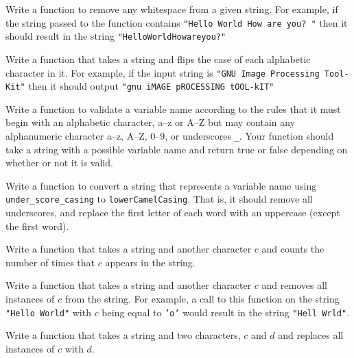 \begin{exer}
Write a function to remove any whitespace from a given string.  
For example, if the string passed to the function contains
\texttt{"Hello World How    are you?  "} then it should
result in the string \texttt{"HelloWorldHowareyou?"}
\end{exer}

\begin{exer}
Write a function that takes a string and flips the case of each
alphabetic character in it.  For example, if the input string is 
\texttt{"GNU Image Processing Tool-Kit"} then it should
output \texttt{"gnu iMAGE pROCESSING tOOL-kIT"}
\end{exer}

\begin{exer}
Write a function to validate a variable name according to the rules
that it must begin with an alphabetic character, a--z or A--Z but
may contain any alphanumeric character a--z, A--Z, 0--9, or underscores
\texttt{_}.  Your function should take a string with a possible
variable name and return true or false depending on whether or
not it is valid.
\end{exer}

\begin{exer}
Write a function to convert a string that represents a variable name
using \texttt{under_score_casing} to \texttt{lowerCamelCasing}.
That is, it should remove all underscores, and replace the first
letter of each word with an uppercase (except the first word).
\end{exer}

\begin{exer}
Write a function that takes a string and another character $c$
and counts the number of times that $c$ appears in the string.
\end{exer}

\begin{exer}
Write a function that takes a string and another character $c$ and
removes all instances of $c$ from the string.  For example, a call 
to this function on the string \texttt{"Hello World"} with $c$
being equal to \texttt{'o'} would result in the string \texttt{"Hell Wrld"}.
\end{exer}

\begin{exer}
Write a function that takes a string and two characters, $c$ and $d$
and replaces all instances of $c$ with $d$.  
\end{exer}

